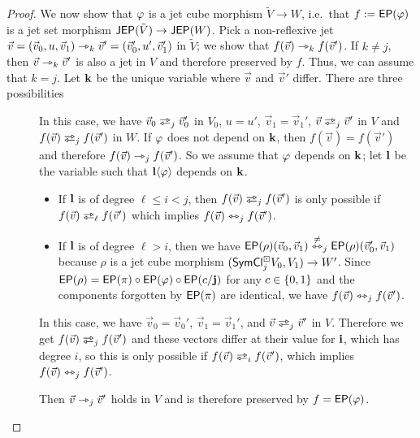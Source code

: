 \documentclass[a4paper]{memoir}
\begin{document}
\begin{proof}
	We now show that $\varphi$ is a jet cube morphism $\tilde V \to W$, i.e.\ that $f := \mathsf{EP}(\varphi)$ is a jet set morphism $\mathsf{JEP}(\tilde V) \to \mathsf{JEP}(W)$.
	Pick a non-reflexive jet $\vec v = (\vec v_0, u, \vec v_1) \rightarrowtriangle_k \vec v' = (\vec v_0', u', \vec v_1')$ in $\tilde V$; we show that $f(\vec v) \rightarrowtriangle_k f(\vec v')$.
	If $k \neq j$, then $\vec v \rightarrowtriangle_k \vec v'$ is also a jet in $V$ and therefore preserved by $f$.
	Thus, we can assume that $k = j$.
	Let $\mathbf{k}$ be the unique variable where $\vec v$ and $\vec v'$ differ.
	There are three possibilities
	\begin{description}
		\item[]
		In this case, we have $\vec v_0 \infrajet_j \vec v_0'$ in $V_0$, $u = u'$, $\vec v_1 = \vec v_1'$, $\vec v \infrajet_j \vec v'$ in $V$ and $f(\vec v) \infrajet_j f(\vec v')$ in $W$.
		If $\varphi$ does not depend on $\mathbf{k}$, then $f(\vec v) = f(\vec v')$ and therefore $f(\vec v) \rightarrowtriangle_j f(\vec v')$.
		So we assume that $\varphi$ depends on $\mathbf{k}$; let $\mathbf{l}$ be the variable such that $\mathbf{l} \langle \varphi \rangle$ depends on $\mathbf{k}$.
		\begin{itemize}
			\item If $\mathbf{l}$ is of degree $\ell \leq i < j$, then $f(\vec v) \infrajet_j f(\vec v')$ is only possible if $f(\vec v) \infrajet_\ell f(\vec v')$ which implies $f(\vec v) \leftrightarrowtriangle_j f(\vec v')$.
			\item If $\mathbf{l}$ is of degree $\ell > i$, then we have $\mathsf{EP}(\rho)(\vec v_0, \vec v_1) \overset{\neq}{\leftrightarrowtriangle}_j \mathsf{EP}(\rho)(\vec v_0', \vec v_1)$ because $\rho$ is a jet cube morphism $(\mathsf{SymCl}^\boxdot_j V_0, V_1) \to W'$.
			Since $\mathsf{EP}(\rho) = \mathsf{EP}(\pi) \circ \mathsf{EP}(\varphi) \circ \mathsf{EP}(c/\mathbf{j})$ for any $c \in \mathopen{}\left\{ 0, 1 \right\}\mathclose{}$ and the components forgotten by $\mathsf{EP}(\pi)$ are identical,
			we have $f(\vec v) \leftrightarrowtriangle_j f(\vec v')$.
		\end{itemize}
		
		\item[] In this case, we have $\vec v_0 = \vec v_0'$, $\vec v_1 = \vec v_1'$, and $\vec v \infrajet_j \vec v'$ in $V$.
		Therefore we get $f(\vec v) \infrajet_j f(\vec v')$ and these vectors differ at their value for $\mathbf{i}$, which has degree $i$, so this is only possible if $f(\vec v) \infrajet_i f(\vec v')$, which implies $f(\vec v) \leftrightarrowtriangle_j f(\vec v')$.
		
		\item[] Then $\vec v \rightarrowtriangle_j \vec v'$ holds in $V$ and is therefore preserved by $f = \mathsf{EP}(\varphi)$. \qedhere
	\end{description}
\end{proof}
\end{document}
